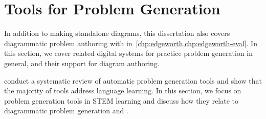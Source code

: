 






\section{Tools for Problem Generation}
\label{sec:problem-generation}

In addition to making standalone diagrams, this dissertation also covers diagrammatic problem authoring with \Edgeworth in~\cref{chp:edgeworth,chp:edgeworth-eval}. In this section, we cover related digital systems for practice problem generation in general, and their support for diagram authoring.

\citet{kurdi_systematic_2020} conduct a systematic review of automatic problem generation tools and show that the majority of tools address language learning. In this section, we focus on problem generation tools in STEM learning and discuss how they relate to diagrammatic problem generation and \Edgeworth. 

